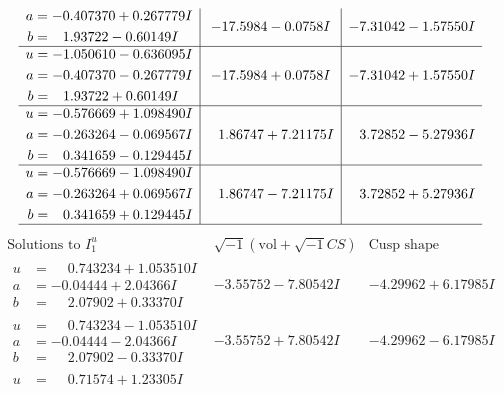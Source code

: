 \documentclass[1p]{elsarticle_modified}
\theoremstyle{definition}
\newcommand{\I}{\sqrt{-1}}
\begin{document}
$$\begin{array}{c|c|c}
\begin{aligned}
a &= -0.407370 + 0.267779 I \\
b &= \phantom{-}1.93722 - 0.60149 I\end{aligned}
 & -17.5984 - 0.0758 I & -7.31042 - 1.57550 I \\ \hline\begin{aligned}
u &= -1.050610 - 0.636095 I \\
a &= -0.407370 - 0.267779 I \\
b &= \phantom{-}1.93722 + 0.60149 I\end{aligned}
 & -17.5984 + 0.0758 I & -7.31042 + 1.57550 I \\ \hline\begin{aligned}
u &= -0.576669 + 1.098490 I \\
a &= -0.263264 - 0.069567 I \\
b &= \phantom{-}0.341659 - 0.129445 I\end{aligned}
 & \phantom{-}1.86747 + 7.21175 I & \phantom{-}3.72852 - 5.27936 I \\ \hline\begin{aligned}
u &= -0.576669 - 1.098490 I \\
a &= -0.263264 + 0.069567 I \\
b &= \phantom{-}0.341659 + 0.129445 I\end{aligned}
 & \phantom{-}1.86747 - 7.21175 I & \phantom{-}3.72852 + 5.27936 I\\
 \hline 
 \end{array}$$\newpage$$\begin{array}{c|c|c}  
\text{Solutions to }I^u_{1}& \I (\text{vol} + \sqrt{-1}CS) & \text{Cusp shape}\\
 \hline 
\begin{aligned}
u &= \phantom{-}0.743234 + 1.053510 I \\
a &= -0.04444 + 2.04366 I \\
b &= \phantom{-}2.07902 + 0.33370 I\end{aligned}
 & -3.55752 - 7.80542 I & -4.29962 + 6.17985 I \\ \hline\begin{aligned}
u &= \phantom{-}0.743234 - 1.053510 I \\
a &= -0.04444 - 2.04366 I \\
b &= \phantom{-}2.07902 - 0.33370 I\end{aligned}
 & -3.55752 + 7.80542 I & -4.29962 - 6.17985 I \\ \hline\begin{aligned}
u &= \phantom{-}0.71574 + 1.23305 I \\

\end{aligned}
\end{array}$$
\end{document}
